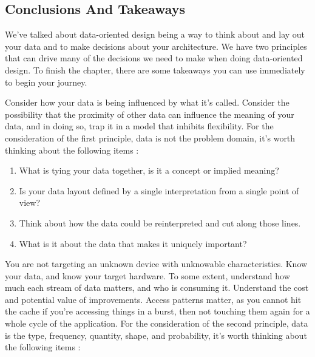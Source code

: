 \documentclass[a4paper,12pt]{article}
\begin{document}
\subsection{Conclusions And Takeaways}

We've talked about data-oriented design being a way to think about and lay out your data and to make decisions about your architecture.
We have two principles that can drive many of the decisions we need to make when doing data-oriented design.
To finish the chapter, there are some takeaways you can use immediately to begin your journey.

Consider how your data is being influenced by what it's called.
Consider the possibility that the proximity of other data can influence the meaning of your data, and in doing so, trap it in a model that inhibits flexibility.
For the consideration of the first principle, data is not the problem domain, it's worth thinking about the following items :

\begin{enumerate}
      \item
            What is tying your data together, is it a concept or implied meaning?
      \item
            Is your data layout defined by a single interpretation from a single point of view?
      \item
            Think about how the data could be reinterpreted and cut along those lines.
      \item
            What is it about the data that makes it uniquely important?
\end{enumerate}

You are not targeting an unknown device with unknowable characteristics.
Know your data, and know your target hardware.
To some extent, understand how much each stream of data matters, and who is consuming it.
Understand the cost and potential value of improvements.
Access patterns matter, as you cannot hit the cache if you're accessing things in a burst, then not touching them again for a whole cycle of the application.
For the consideration of the second principle, data is the type, frequency, quantity, shape, and probability, it's worth thinking about the following items :
\end{document}
